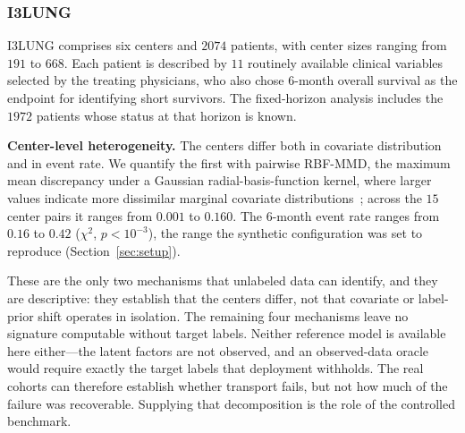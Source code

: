%
%

\subsubsection{I3LUNG}
\label{sec:I3LUNG}

I3LUNG comprises six centers and $2074$ patients, with center sizes ranging
from $191$ to $668$.%
Each patient is described by $11$ routinely available clinical variables
selected by the treating physicians, who also chose $6$-month overall survival
as the endpoint for identifying short survivors. The fixed-horizon analysis
includes the $1972$ patients whose status at that horizon is known.

\textbf{Center-level heterogeneity.}
The centers differ both in covariate distribution and in event rate. We
quantify the first with pairwise RBF-MMD, the maximum mean discrepancy under a
Gaussian radial-basis-function kernel, where larger values indicate more
dissimilar marginal covariate distributions~\cite{gretton2012kernel}; across the
$15$ center pairs it ranges from $0.001$ to $0.160$. The $6$-month event rate
ranges from $0.16$ to $0.42$ ($\chi^2$, $p<10^{-3}$), the range the synthetic
configuration was set to reproduce (Section~\ref{sec:setup}).

These are the only two mechanisms that unlabeled data can identify, and they are
descriptive: they establish that the centers differ, not that covariate or
label-prior shift operates in isolation. The remaining four mechanisms leave no
signature computable without target labels. Neither reference model is available
here either---the latent factors are not observed, and an observed-data oracle
would require exactly the target labels that deployment withholds. The real
cohorts can therefore establish whether transport fails, but not how much of the
failure was recoverable. Supplying that decomposition is the role of the
controlled benchmark.

